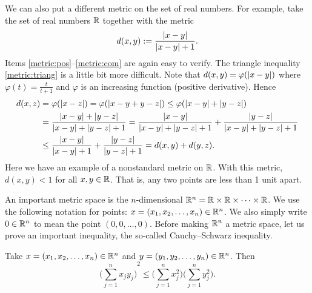 \begin{example}
We can also put a different metric on the set of real numbers.
For example, take the set of real numbers ${\mathbb{R}}$ together with the metric
\begin{equation*}
d(x,y) :=
\frac{\left\lvert {x-y} \right\rvert}{\left\lvert {x-y} \right\rvert+1} .
\end{equation*}
Items \ref{metric:pos}--\ref{metric:com} are again easy to verify.  The
triangle inequality \ref{metric:triang} is a little bit more difficult.
Note that $d(x,y) = \varphi(\left\lvert {x-y} \right\rvert)$ where $\varphi(t) =
\frac{t}{t+1}$ and $\varphi$ is an increasing function
(positive derivative).  Hence
\begin{equation*}
\begin{split}
d(x,z) & = \varphi(\left\lvert {x-z} \right\rvert) = 
\varphi(\left\lvert {x-y+y-z} \right\rvert) \leq
\varphi(\left\lvert {x-y} \right\rvert+\left\lvert {y-z} \right\rvert)
\\
& =
\frac{\left\lvert {x-y} \right\rvert+\left\lvert {y-z} \right\rvert}{\left\lvert {x-y} \right\rvert+\left\lvert {y-z} \right\rvert+1} =
\frac{\left\lvert {x-y} \right\rvert}{\left\lvert {x-y} \right\rvert+\left\lvert {y-z} \right\rvert+1} +
\frac{\left\lvert {y-z} \right\rvert}{\left\lvert {x-y} \right\rvert+\left\lvert {y-z} \right\rvert+1}
\\
& \leq
\frac{\left\lvert {x-y} \right\rvert}{\left\lvert {x-y} \right\rvert+1} +
\frac{\left\lvert {y-z} \right\rvert}{\left\lvert {y-z} \right\rvert+1} =
d(x,y)+ d(y,z) .
\end{split}
\end{equation*}
Here we have an example of a nonstandard metric on ${\mathbb{R}}$.  With this metric,
$d(x,y) < 1$ for all $x,y \in {\mathbb{R}}$.  That is,
any two points are less than 1 unit apart.
\end{example}

An important metric space is the
$n$-dimensional \emph{} ${\mathbb{R}}^n = {\mathbb{R}}
\times {\mathbb{R}} \times \cdots \times {\mathbb{R}}$.   We use the following
notation for points: $x =(x_1,x_2,\ldots,x_n) \in {\mathbb{R}}^n$.  We also
simply write $0 \in {\mathbb{R}}^n$ to mean the point $(0,0,\ldots,0)$.  Before
making ${\mathbb{R}}^n$ a metric space, let us prove an important inequality, the
so-called Cauchy--Schwarz inequality.

\begin{lemma}
Take $x =(x_1,x_2,\ldots,x_n) \in {\mathbb{R}}^n$ and $y =(y_1,y_2,\ldots,y_n) \in
{\mathbb{R}}^n$.  Then
\begin{equation*}
{\biggl( \sum_{j=1}^n x_j y_j \biggr)}^2
\leq
\biggl(\sum_{j=1}^n x_j^2 \biggr)
\biggl(\sum_{j=1}^n y_j^2 \biggr) .
\end{equation*}
\end{lemma}

